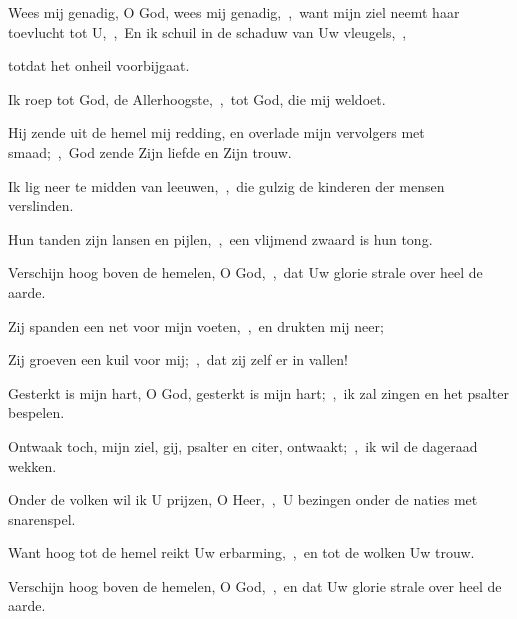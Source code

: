 \documentclass[12pt,twoside,a5paper]{article}
\begin{document}


\begin{halfparskip}
  Wees mij genadig, O God, wees mij genadig,~\sep\ want mijn ziel neemt haar toevlucht tot U,~\sep\ En ik schuil in de schaduw van Uw vleugels,~\sep


  totdat het onheil voorbijgaat.

  Ik roep tot God, de Allerhoogste,~\sep\ tot God, die mij weldoet.

  Hij zende uit de hemel mij redding, en overlade mijn vervolgers met smaad;~\sep\ God zende Zijn liefde en Zijn trouw.

  Ik lig neer te midden van leeuwen,~\sep\ die gulzig de kinderen der mensen verslinden.

  Hun tanden zijn lansen en pijlen,~\sep\ een vlijmend zwaard is hun tong.

  Verschijn hoog boven de hemelen, O God,~\sep\ dat Uw glorie strale over heel de aarde.
\end{halfparskip}


\begin{halfparskip}
  Zij spanden een net voor mijn voeten,~\sep\ en drukten mij neer;

  Zij groeven een kuil voor mij;~\sep\ dat zij zelf er in vallen!

  Gesterkt is mijn hart, O God, gesterkt is mijn hart;~\sep\ ik zal zingen en het psalter bespelen.

  Ontwaak toch, mijn ziel, gij, psalter en citer, ontwaakt;~\sep\ ik wil de dageraad wekken.

  Onder de volken wil ik U prijzen, O Heer,~\sep\ U bezingen onder de naties met snarenspel.

  Want hoog tot de hemel reikt Uw erbarming,~\sep\ en tot de wolken Uw trouw.

  Verschijn hoog boven de hemelen, O God,~\sep\ en dat Uw glorie strale over heel de aarde.
\end{halfparskip}


\end{document}
